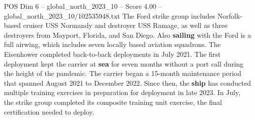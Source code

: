 \begin{textsample}{POS Dim 6 – global\_north\_2023\_10 – Score 4.00 – global\_north\_2023\_10/102535948.txt}
The Ford strike group includes Norfolk-based cruiser USS Normandy and destroyer USS Ramage, as well as three destroyers from Mayport, Florida, and San Diego.
Also \textbf{sailing} with the Ford is a full airwing, which includes seven locally based aviation squadrons.
The Eisenhower completed back-to-back deployments in July 2021.
The first deployment kept the carrier at \textbf{sea} for seven months without a port call during the height of the pandemic.
The carrier began a 15-month maintenance period that spanned August 2021 to December 2022.
Since then, the \textbf{ship} has conducted multiple training exercises in preparation for deployment in late 2023.
In July, the strike group completed its composite training unit exercise, the final certification needed to deploy.

\end{textsample}
